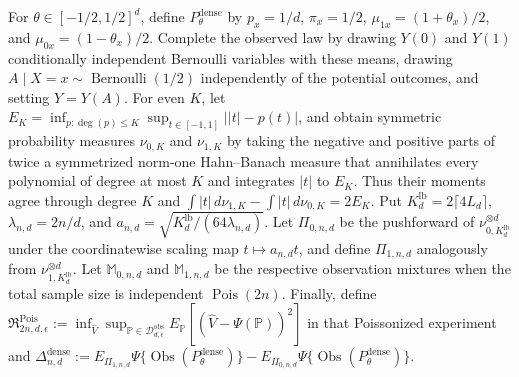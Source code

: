 For \(\theta\in[-1/2,1/2]^d\), define \(P_\theta^{\mathrm{dense}}\) by \(p_x=1/d\), \(\pi_x=1/2\), \(\mu_{1x}=(1+\theta_x)/2\), and \(\mu_{0x}=(1-\theta_x)/2\). Complete the observed law by drawing \(Y(0)\) and \(Y(1)\) conditionally independent Bernoulli variables with these means, drawing \(A\mid X=x\sim\operatorname{Bernoulli}(1/2)\) independently of the potential outcomes, and setting \(Y=Y(A)\). For even \(K\), let \(E_K=\inf_{p:\deg(p)\leq K}\sup_{t\in[-1,1]}\lvert\lvert t\rvert-p(t)\rvert\), and obtain symmetric probability measures \(\nu_{0,K}\) and \(\nu_{1,K}\) by taking the negative and positive parts of twice a symmetrized norm-one Hahn--Banach measure that annihilates every polynomial of degree at most \(K\) and integrates \(\lvert t\rvert\) to \(E_K\). Thus their moments agree through degree \(K\) and \(\int\lvert t\rvert\,d\nu_{1,K}-\int\lvert t\rvert\,d\nu_{0,K}=2E_K\). Put \(K_d^{\mathrm{lb}}=2\lceil4L_d\rceil\), \(\lambda_{n,d}=2n/d\), and \(a_{n,d}=\sqrt{K_d^{\mathrm{lb}}/(64\lambda_{n,d})}\). Let \(\Pi_{0,n,d}\) be the pushforward of \(\nu_{0,K_d^{\mathrm{lb}}}^{\otimes d}\) under the coordinatewise scaling map \(t\mapsto a_{n,d}t\), and define \(\Pi_{1,n,d}\) analogously from \(\nu_{1,K_d^{\mathrm{lb}}}^{\otimes d}\). Let \(\mathbb M_{0,n,d}\) and \(\mathbb M_{1,n,d}\) be the respective observation mixtures when the total sample size is independent \(\operatorname{Pois}(2n)\). Finally, define \(\mathfrak R^{\mathrm{Pois}}_{2n,d,\epsilon}:=\inf_{\widehat V}\sup_{\mathbb P\in\mathcal D_{d,\epsilon}^{\mathrm{obs}}}E_{\mathbb P}[(\widehat V-\Psi(\mathbb P))^2]\) in that Poissonized experiment and \(\Delta_{n,d}^{\mathrm{dense}}:=E_{\Pi_{1,n,d}}\Psi\{\operatorname{Obs}(P_\theta^{\mathrm{dense}})\}-E_{\Pi_{0,n,d}}\Psi\{\operatorname{Obs}(P_\theta^{\mathrm{dense}})\}\).